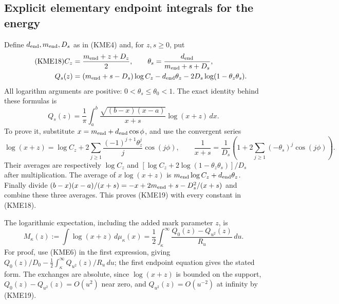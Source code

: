 \subsection{Explicit elementary endpoint integrals for the energy}
Define $d_{\rm end},m_{\rm end},D_s$ as in (KME4) and, for $z,s\geq0$, put
\begin{align}\tag{KME18}
 C_z&=\frac{m_{\rm end}+z+D_z}{2},\qquad
 \theta_s=\frac{d_{\rm end}}{m_{\rm end}+s+D_s},\\
 Q_s(z)&=(m_{\rm end}+s-D_s)\log C_z-d_{\rm end}\theta_z
                         -2D_s\log(1-\theta_z\theta_s).
 \notag
\end{align}
All logarithm arguments are positive: $0<\theta_s\leq\theta_0<1$.
The exact identity behind these formulas is
\begin{equation}\tag{KME19}
 Q_s(z)=\frac1\pi\int_a^b
          \frac{\sqrt{(b-x)(x-a)}}{x+s}\log(x+z)\,dx.
\end{equation}
To prove it, substitute $x=m_{\rm end}+d_{\rm end}\cos\phi$, and use the convergent series
\[
 \log(x+z)=\log C_z+
       2\sum_{j\geq1}\frac{(-1)^{j+1}\theta_z^j}{j}\cos(j\phi),
 \qquad
 \frac1{x+s}=\frac1{D_s}
       \left(1+2\sum_{j\geq1}(-\theta_s)^j\cos(j\phi)\right).
\]
Their averages are respectively $\log C_z$ and
$[\log C_z+2\log(1-\theta_z\theta_s)]/D_s$ after multiplication.
The average of $x\log(x+z)$ is $m_{\rm end}\log C_z+d_{\rm end}\theta_z$.
Finally divide
$(b-x)(x-a)/(x+s)=-x+2m_{\rm end}+s-D_s^2/(x+s)$ and combine these three
averages. This proves (KME19) with every constant in (KME18).

The logarithmic expectation, including the added mark parameter $z$, is
\begin{equation}\tag{KME20}
 M_\kappa(z):=\int\log(x+z)\,d\mu_\kappa(x)
       =\frac12\int_\kappa^\infty
                    \frac{Q_0(z)-Q_{u^2}(z)}{R_u}\,du.
\end{equation}
For proof, use (KME6) in the first expression, giving
$Q_0(z)/D_0-\tfrac12\int_\kappa^\infty Q_{u^2}(z)/R_u\,du$;
the first endpoint equation gives the stated form.
The exchanges are absolute, since $\log(x+z)$ is bounded on the
support, $Q_0(z)-Q_{u^2}(z)=O(u^2)$ near zero, and
$Q_{u^2}(z)=O(u^{-2})$ at infinity by (KME19).

